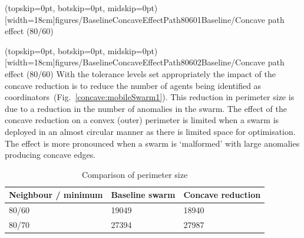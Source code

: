 \documentclass{ieeeaccess}
\begin{document}
\Figure[t!](topskip=0pt, botskip=0pt, midskip=0pt)[width=18cm]{figures/BaselineConcaveEffectPath80601}{Baseline/Concave path effect (80/60)\label{concave:BaselineConcaveEffectPath80601}}

\Figure[t!](topskip=0pt, botskip=0pt, midskip=0pt)[width=18cm]{figures/BaselineConcaveEffectPath80602}{Baseline/Concave path effect (80/60)\label{concave:BaselineConcaveEffectPath80602}}
With the tolerance levels set appropriately the impact of the concave reduction is to reduce the number of agents being identified as coordinators~(Fig.~\ref{concave:mobileSwarm1}). This reduction in perimeter size is due to a reduction in the number of anomalies in the swarm. The effect of the concave reduction on a convex (outer) perimeter is limited when a swarm is deployed in an almost circular manner as there is limited space for optimisation. The effect is more pronounced when a swarm is `malformed' with large anomalies producing concave edges.

\begin{table}
\caption{Comparison of perimeter size} 
\label{tab:BaselineConcaveComparison}
\begin{center}
\begin{tabular}{| p{2.3cm} | p{2cm} | p{2cm} |}
\hline
\bf Neighbour / minimum & \bf Baseline \bf swarm & \bf Concave \bf reduction \\ \hline
80/60 & 19049 & 18940 \\  \hline
80/70 & 27394 & 27987 \\  \hline
\end{tabular}
\end{center}
\end{table}
\end{document}
